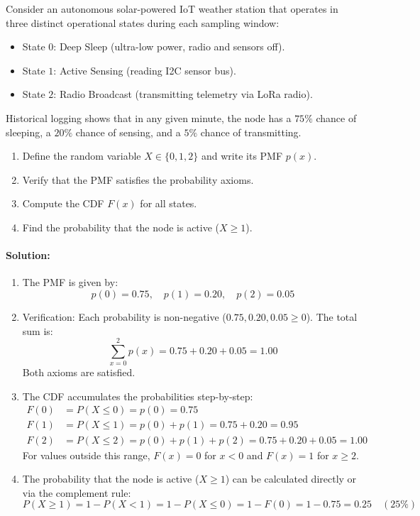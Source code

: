 \begin{example}
Consider an autonomous solar-powered IoT weather station that operates in three distinct operational states during each sampling window:
\begin{itemize}
    \item State $0$: Deep Sleep (ultra-low power, radio and sensors off).
    \item State $1$: Active Sensing (reading I2C sensor bus).
    \item State $2$: Radio Broadcast (transmitting telemetry via LoRa radio).
\end{itemize}
Historical logging shows that in any given minute, the node has a $75\%$ chance of sleeping, a $20\%$ chance of sensing, and a $5\%$ chance of transmitting.
\begin{enumerate}
    \item Define the random variable $X \in \{0, 1, 2\}$ and write its PMF $p(x)$.
    \item Verify that the PMF satisfies the probability axioms.
    \item Compute the CDF $F(x)$ for all states.
    \item Find the probability that the node is active ($X \ge 1$).
\end{enumerate}

\paragraph{Solution:}
\begin{enumerate}
    \item The PMF is given by:
    \begin{equation*}
    p(0) = 0.75, \quad p(1) = 0.20, \quad p(2) = 0.05
    \end{equation*}
    \item Verification:
    Each probability is non-negative ($0.75, 0.20, 0.05 \ge 0$).
    The total sum is:
    \begin{equation*}
    \sum_{x=0}^{2} p(x) = 0.75 + 0.20 + 0.05 = 1.00
    \end{equation*}
    Both axioms are satisfied.
    \item The CDF accumulates the probabilities step-by-step:
    \begin{align*}
    F(0) &= P(X \le 0) = p(0) = 0.75 \\
    F(1) &= P(X \le 1) = p(0) + p(1) = 0.75 + 0.20 = 0.95 \\
    F(2) &= P(X \le 2) = p(0) + p(1) + p(2) = 0.75 + 0.20 + 0.05 = 1.00
    \end{align*}
    For values outside this range, $F(x) = 0$ for $x < 0$ and $F(x) = 1$ for $x \ge 2$.
    \item The probability that the node is active ($X \ge 1$) can be calculated directly or via the complement rule:
    \begin{equation*}
    P(X \ge 1) = 1 - P(X < 1) = 1 - P(X \le 0) = 1 - F(0) = 1 - 0.75 = \mathbf{0.25} \quad (25\%)
    \end{equation*}
\end{enumerate}
\end{example}

